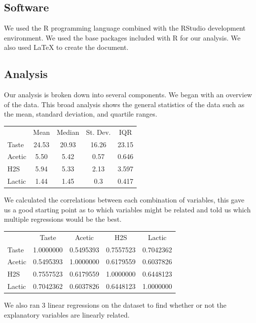 \documentclass[12pt]{article}
\begin{document}
\begin{doublespace}
	\subsection{Software}
		We used the R programming language combined with the RStudio development environment. We used the base packages included with R for our analysis. We also used \LaTeX \xspace to create the document.\par
		
	\subsection{Analysis}
		Our analysis is broken down into several components. We began with an overview of the data. This broad analysis shows the general statistics of the data such as the mean, standard deviation, and quartile ranges.\par
	\begin{center}
	\begin{tabular}{lcccc}
		& Mean & Median & St. Dev. & IQR\\
		Taste & 24.53 & 20.93 & 16.26 & 23.15\\
		Acetic & 5.50 & 5.42 & 0.57 & 0.646\\
		H2S & 5.94 & 5.33 & 2.13 & 3.597\\
		Lactic & 1.44 & 1.45 & 0.3 & 0.417\\
	\end{tabular}
	\end{center}\par
		We calculated the correlations between each combination of variables, this gave us a good starting point as to which variables might be related and told us which multiple regressions would be the best. \par
	\begin{center}
	\begin{tabular}{lcccc}
		& Taste & Acetic & H2S & Lactic\\
		Taste & 1.0000000 & 0.5495393 & 0.7557523 & 0.7042362\\
		Acetic & 0.5495393 & 1.0000000 & 0.6179559 & 0.6037826\\
		H2S & 0.7557523 & 0.6179559 & 1.0000000 & 0.6448123\\
		Lactic & 0.7042362 & 0.6037826 & 0.6448123 & 1.0000000\\
	\end{tabular}
	\end{center}\par
		We also ran 3 linear regressions on the dataset to find whether or not the explanatory variables are linearly related. \par

\end{doublespace}
\end{document}
